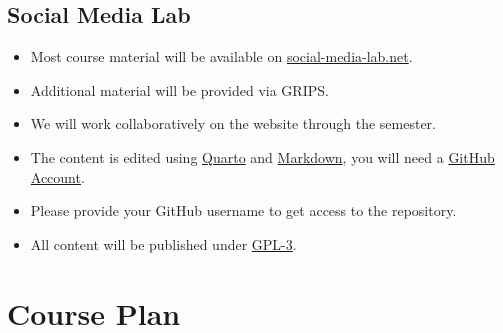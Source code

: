 \documentclass[
  letterpaper,
  DIV=11,
  numbers=noendperiod]{scrartcl}
\providecommand{\tightlist}{%
  \setlength{\itemsep}{0pt}\setlength{\parskip}{0pt}}\usepackage{longtable,booktabs,array}
\begin{document}
\hypertarget{social-media-lab}{%
\subsection{Social Media Lab}\label{social-media-lab}}

\begin{itemize}
\tightlist
\item
  Most course material will be available on
  \href{https://social-media-lab.net}{social-media-lab.net}.
\item
  Additional material will be provided via GRIPS.
\item
  We will work collaboratively on the website through the semester.
\item
  The content is edited using \href{https://quarto.org/}{Quarto} and
  \href{https://en.wikipedia.org/wiki/Markdown}{Markdown}, you will need
  a \href{https://github.com/}{GitHub Account}.
\item
  Please provide your GitHub username to get access to the repository.
\item
  All content will be published under
  \href{https://www.gnu.de/documents/gpl.en.html}{GPL-3}.
\end{itemize}

\hypertarget{course-plan}{%
\section{Course Plan}\label{course-plan}}
\end{document}
